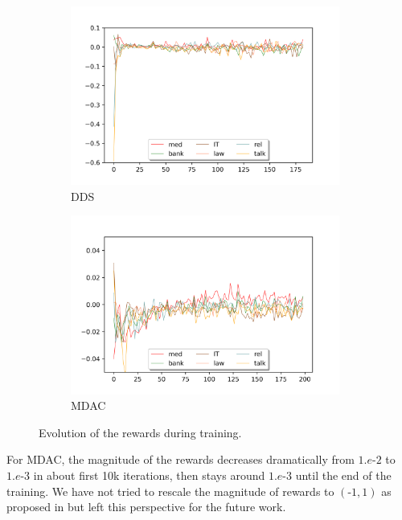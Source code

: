 \begin{figure}[htbp]
\begin{subfigure}{.5\textwidth}
  \centering
  \includegraphics[width=0.97\textwidth]{graphics/rewards_dds.png}  
  \caption{DDS}
  \label{fig:reward-dds-chap7}
\end{subfigure}
\begin{subfigure}{.5\textwidth}
  \centering
  \includegraphics[width=0.97\textwidth]{graphics/rewards_loss.png}  
  \caption{MDAC}
  \label{fig:reward-loss-chap7}
\end{subfigure}
\caption{Evolution of the rewards during training.}
\label{fig:reward-chap7}
\end{figure}

For MDAC, the magnitude of the rewards decreases dramatically from $1.e\text{-}2$ to $1.e\text{-}3$ in about first 10k iterations, then stays around $1.e\text{-}3$ until the end of the training. We have not tried to rescale the magnitude of rewards to $(\text{-}1,1)$ as proposed in \citet{Graves17automated} but left this perspective for the future work. 

